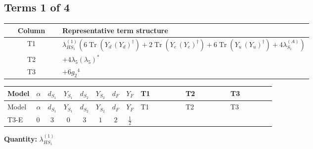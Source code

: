 \documentclass[8pt]{article}
\begin{document}
\begin{landscape}
\subsection*{Terms 1 of 4}
\begin{center}
\begin{tabular}{@{}c >{\raggedright\arraybackslash}p{0.82\linewidth}@{}}
\toprule
Column & Representative term structure \\
\midrule
T1 & \(\displaystyle {\lambda_{HS_1}^{(1)}} (6 \operatorname{Tr}\!\left({Y_d}\,\left({Y_d}\right)^{\dagger}\right)+2 \operatorname{Tr}\!\left({Y_e}\,\left({Y_e}\right)^{\dagger}\right)+6 \operatorname{Tr}\!\left({Y_u}\,\left({Y_u}\right)^{\dagger}\right)+4 {\lambda_{S_1}^{(A)}})\) \\
\midrule
T2 & \(\displaystyle +4 {\lambda_5} \left({\lambda_5}\right)^{*}\) \\
\midrule
T3 & \(\displaystyle +6 {g_2}^4\) \\
\midrule
\bottomrule
\end{tabular}
\end{center}
\smallskip
\tiny
\begin{longtable}{@{}llcccccc >{\raggedright\arraybackslash}p{0.21\linewidth} >{\raggedright\arraybackslash}p{0.21\linewidth} >{\raggedright\arraybackslash}p{0.21\linewidth}@{}}
\toprule
Model & $\alpha$ & $d_{S_1}$ & $Y_{S_1}$ & $d_{S_2}$ & $Y_{S_2}$ & $d_F$ & $Y_F$ & T1 & T2 & T3 \\
\midrule
\endfirsthead
\toprule
Model & $\alpha$ & $d_{S_1}$ & $Y_{S_1}$ & $d_{S_2}$ & $Y_{S_2}$ & $d_F$ & $Y_F$ & T1 & T2 & T3 \\
\midrule
\endhead
T3-E & $0$ & $3$ & $0$ & $3$ & $1$ & $2$ & $\frac{1}{2}$ & \scriptsize\adjustbox{max width=\linewidth}{$\begin{gathered} {\lambda_{HS_1}^{(1)}} (6 \operatorname{Tr}\!\left({Y_d}\,\left({Y_d}\right)^{\dagger}\right)+2 \operatorname{Tr}\!\left({Y_e}\,\left({Y_e}\right)^{\dagger}\right)+6 \operatorname{Tr}\!\left({Y_u}\,\left({Y_u}\right)^{\dagger}\right)+4 {\lambda_{S_1}^{(A)}})\end{gathered}$} & \scriptsize\adjustbox{max width=\linewidth}{$\begin{gathered} +4 {\lambda_5} \left({\lambda_5}\right)^{*}\end{gathered}$} & \scriptsize\adjustbox{max width=\linewidth}{$\begin{gathered} +6 {g_2}^4\end{gathered}$} \\
\midrule
\bottomrule
\end{longtable}
\clearpage
\noindent\textbf{Quantity: }$\lambda_{HS_1}^{(1)}$\par\smallskip

\end{landscape}
\end{document}
